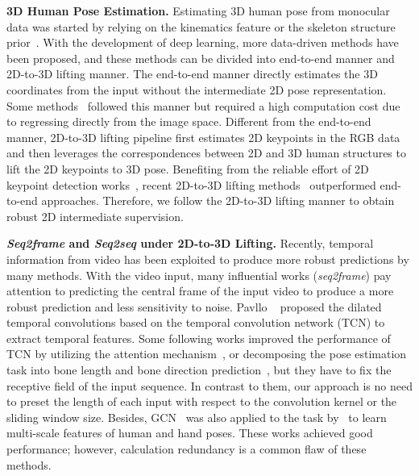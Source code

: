 \documentclass[10pt,twocolumn,letterpaper]{article}
\begin{document}
	\textbf{3D Human Pose Estimation.}
Estimating 3D human pose from monocular data was started by relying on the kinematics feature or the skeleton structure prior~\cite{ramakrishna_reconstructing_2012,ramakrishna2012reconstructing,ionescu_human36m_2014,ionescu_iterated_2014}.
	With the development of deep learning, more data-driven methods have been proposed, and these methods can be divided into end-to-end manner and 2D-to-3D lifting manner.
The end-to-end manner directly estimates the 3D coordinates from the input without the intermediate 2D pose representation.
	Some methods~\cite{corsetofine,sun2018integral,tekin2016direct} followed this manner but required a high computation cost due to regressing directly from the image space.
	Different from the end-to-end manner, 2D-to-3D lifting pipeline first estimates 2D keypoints in the RGB data and then leverages the correspondences between 2D and 3D human structures to lift the 2D keypoints to 3D pose.
	Benefiting from the reliable effort of 2D keypoint detection works~\cite{he2017mask,chen2018cascaded,sun2019deep,newell2016stacked,ma2022remote}, recent 2D-to-3D lifting methods~\cite{semgcn,Ci_2019_ICCV,contextmodeling,graphstacked,liu2020comprehensive,simplebaseline,zhou2017towards} outperformed end-to-end approaches.
Therefore, we follow the 2D-to-3D lifting manner to obtain robust 2D intermediate supervision.
	
\textbf{\textit{Seq2frame} and \textit{Seq2seq} under 2D-to-3D Lifting.}
	Recently, temporal information from video has been exploited to produce more robust predictions by many methods.
	With the video input, many influential works (\textit{seq2frame}) pay attention to predicting the central frame of the input video to produce a more robust prediction and less sensitivity to noise.
	Pavllo \etal~\cite{videopose3d} proposed the dilated temporal convolutions based on the temporal convolution network (TCN) to extract temporal features.
	Some following works improved the performance of TCN by utilizing the attention mechanism~\cite{attentionmechanism}, or decomposing the pose estimation task into bone length and bone direction prediction~\cite{anatomypose}, but they have to fix the receptive field of the input sequence.
	In contrast to them, our approach is no need to preset the length of each input with respect to the convolution kernel or the sliding window size.
	Besides, GCN~\cite{gcn} was also applied to the task by~\cite{cai2019exploiting} to learn multi-scale features of human and hand poses.
	These works achieved good performance; however, calculation redundancy is a common flaw of these methods.
	
\end{document}
